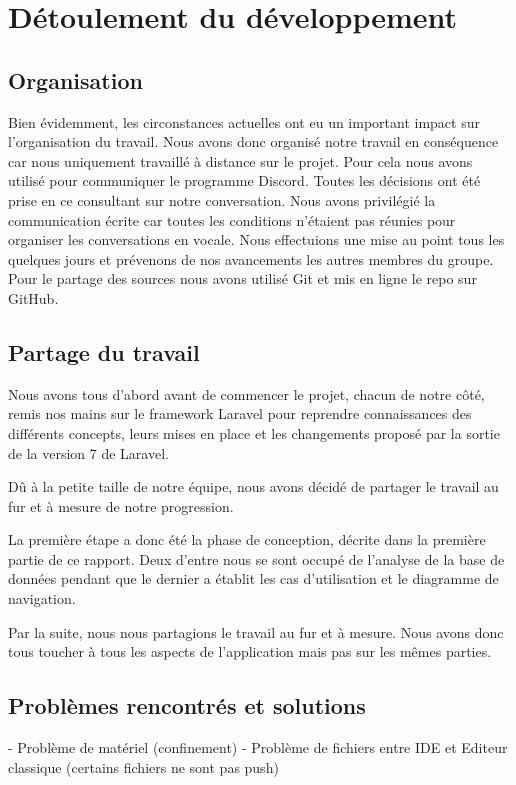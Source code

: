 \documentclass[12pt]{article}
\begin{document}
\newpage

\section{Détoulement du développement}

\subsection{Organisation}

Bien évidemment, les circonstances actuelles ont eu un important impact sur l'organisation du travail. Nous avons donc organisé notre travail en conséquence car nous uniquement travaillé à distance sur le projet. Pour cela nous avons utilisé pour communiquer le programme Discord. Toutes les décisions ont été prise en ce consultant sur notre conversation. Nous avons privilégié la communication écrite car toutes les conditions n'étaient pas réunies pour organiser les conversations en vocale. Nous effectuions une mise au point tous les quelques jours et prévenons de nos avancements les autres membres du groupe. Pour le partage des sources nous avons utilisé Git et mis en ligne le repo sur GitHub.

\subsection{Partage du travail}

Nous avons tous d'abord avant de commencer le projet, chacun de notre côté, remis nos mains sur le framework
Laravel pour reprendre connaissances des différents concepts, leurs mises en place et les changements proposé par la sortie de la version 7 de Laravel.

Dû à la petite taille de notre équipe, nous avons décidé de partager le travail au fur et à mesure de notre progression. 

La première étape a donc été la phase de conception, décrite dans la première partie de ce rapport. Deux d'entre nous se sont occupé de l'analyse de la base de données pendant que le dernier a établit les cas d'utilisation et le diagramme  de navigation.

Par la suite, nous nous partagions le travail au fur et à mesure. Nous avons donc tous toucher à tous les aspects de l'application mais pas sur les mêmes parties.

\subsection{Problèmes rencontrés et solutions}
- Problème de matériel (confinement)
- Problème de fichiers entre IDE et Editeur classique (certains fichiers ne sont pas push)
\end{document}
